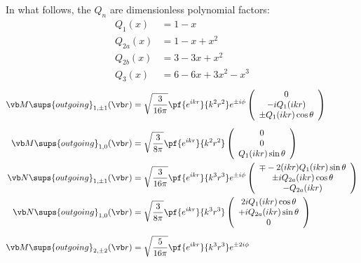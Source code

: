\documentclass[letterpaper]{article}
\begin{document}
In what follows, the $Q_n$ are dimensionless polynomial factors:
\begin{align*}
 Q_1(x) &= 1-x \\
 Q_{2a}(x) &= 1-x+x^2 \\
 Q_{2b}(x) &= 3-3x+x^2 \\
 Q_3(x) &= 6-6x+3x^2-x^3
\end{align*}
\begin{align*}
 \vb M\sups{outgoing}_{1,\pm 1}(\vb r)
  &=\sqrt\frac{3}{16\pi}\pf{e^{ikr}}{k^2 r^2} e^{\pm i\phi}
    \left(\begin{array}{c}
    0          \\
    -iQ_1(ikr) \\
    \pm Q_1(ikr) \cos\theta 
    \end{array}\right)
\\[5pt]
 \vb M\sups{outgoing}_{1,0}(\vb r)
  &=\sqrt\frac{3}{8\pi}\pf{e^{ikr}}{k^2 r^2}
    \left(\begin{array}{c}
    0       \\
    0       \\
    Q_1(ikr) \sin\theta 
    \end{array}\right)
\\
 \vb N\sups{outgoing}_{1,\pm 1}(\vb r)
  &=\sqrt\frac{3}{16\pi}\pf{e^{ikr}}{k^3 r^3} e^{\pm i\phi}
    \left(\begin{array}{c}
    \mp -2(ikr)Q_1(ikr)\sin \theta   \\
    \pm iQ_{2a}(ikr) \cos\theta      \\
    -Q_{2a}(ikr)
    \end{array}\right)
\\
 \vb N\sups{outgoing}_{1,0}(\vb r)
  &=\sqrt\frac{3}{8\pi}\pf{e^{ikr}}{k^3 r^3}
    \left(\begin{array}{c}
    2iQ_1(ikr)\cos \theta		\\
    +iQ_{2a}(ikr)\sin\theta	\\
    0
    \end{array}\right)
\\[5pt]
 \vb M\sups{outgoing}_{2,\pm 2}(\vb r)
  &=\sqrt\frac{5}{16\pi}\pf{e^{ikr}}{k^3 r^3} e^{\pm 2i\phi}

\end{align*}
\end{document}

